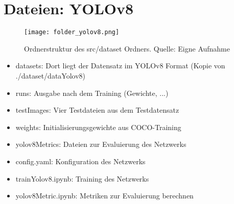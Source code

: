 \section{Dateien: YOLOv8}
\begin{figure}[h]
	\centering
	\texttt{[image: folder\_yolov8.png]}
	\caption[Ordnerstruktur des src/dataset Ordners.]{Ordnerstruktur des src/dataset Ordners. Quelle: Eigne Aufnahme}
\end{figure}

\begin{itemize}
	\item datasets: Dort liegt der Datensatz im YOLOv8 Format (Kopie von ./dataset/dataYolov8)
	\item runs: Ausgabe nach dem Training (Gewichte, ...)
	\item testImages: Vier Testdateien aus dem Testdatensatz
	\item weights: Initialisierungsgewichte aus COCO-Training
	\item yolov8Metrics: Dateien zur Evaluierung des Netzwerks
	\item config.yaml:  Konfiguration des Netzwerks
	\item trainYolov8.ipynb: Training des Netzwerks
	\item yolov8Metric.ipynb: Metriken zur Evaluierung berechnen
\end{itemize}